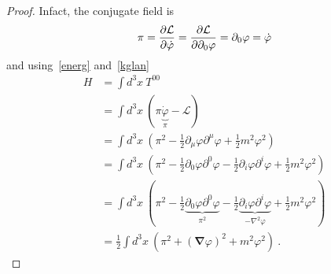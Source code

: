     \begin{proof}
        Infact, the conjugate field is 
        \begin{equation}\label{conjfield}
        \begin{aligned}
            \pi = \frac{\partial\mathcal L}{\partial\dot \varphi} = \frac{\partial\mathcal L}{\partial\partial_0 \varphi} = \partial_0 \varphi = \dot \varphi 
        \end{aligned}
        \end{equation}
        and using~\eqref{energ} and~\eqref{kglan}
        \begin{equation*}
        \begin{aligned}
            H & = \int d^3 x ~ T^{00} \\ & = \int d^3 x ~(\pi \underbrace{\dot \varphi}_\pi - \mathcal L) \\ & = \int d^3 x ~(\pi^2 - \frac{1}{2} \partial_\mu \varphi \partial^\mu \varphi + \frac{1}{2} m^2 \varphi^2) \\ & = \int d^3 x ~(\pi^2 - \frac{1}{2} \partial_0 \varphi \partial^0 \varphi - \frac{1}{2} \partial_i \varphi \partial^i \varphi + \frac{1}{2} m^2 \varphi^2) \\ & = \int d^3 x ~(\pi^2 - \frac{1}{2} \underbrace{\partial_0 \varphi \partial^0 \varphi}_{\pi^2} - \frac{1}{2} \underbrace{\partial_i \varphi \partial^i \varphi}_{- \nabla^2 \varphi} + \frac{1}{2} m^2 \varphi^2) \\ & = \frac{1}{2} \int d^3 x ~ (\pi^2 + (\boldsymbol \nabla \varphi)^2 + m^2 \varphi^2) ~.
        \end{aligned}
        \end{equation*}


\end{proof}

